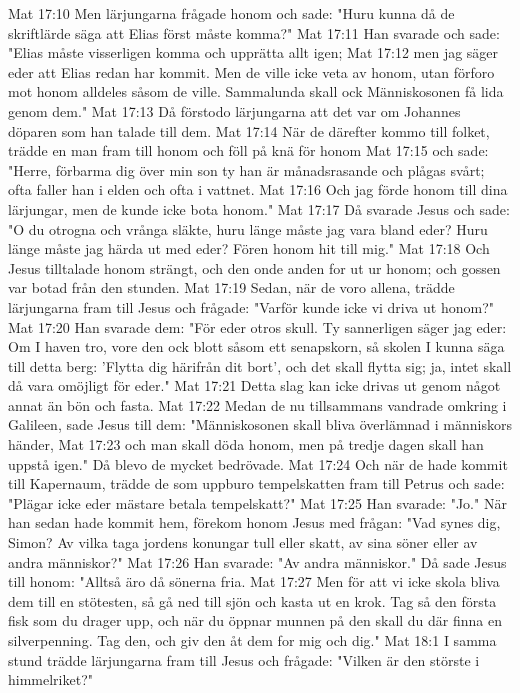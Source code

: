 Mat 17:10  Men lärjungarna frågade honom och sade: "Huru kunna då de skriftlärde säga att Elias först måste komma?"
Mat 17:11  Han svarade och sade: "Elias måste visserligen komma och upprätta allt igen;
Mat 17:12  men jag säger eder att Elias redan har kommit. Men de ville icke veta av honom, utan förforo mot honom alldeles såsom de ville. Sammalunda skall ock Människosonen få lida genom dem."
Mat 17:13  Då förstodo lärjungarna att det var om Johannes döparen som han talade till dem.
Mat 17:14  När de därefter kommo till folket, trädde en man fram till honom och föll på knä för honom
Mat 17:15  och sade: "Herre, förbarma dig över min son ty han är månadsrasande och plågas svårt; ofta faller han i elden och ofta i vattnet.
Mat 17:16  Och jag förde honom till dina lärjungar, men de kunde icke bota honom."
Mat 17:17  Då svarade Jesus och sade: "O du otrogna och vrånga släkte, huru länge måste jag vara bland eder? Huru länge måste jag härda ut med eder? Fören honom hit till mig."
Mat 17:18  Och Jesus tilltalade honom strängt, och den onde anden for ut ur honom; och gossen var botad från den stunden.
Mat 17:19  Sedan, när de voro allena, trädde lärjungarna fram till Jesus och frågade: "Varför kunde icke vi driva ut honom?"
Mat 17:20  Han svarade dem: "För eder otros skull. Ty sannerligen säger jag eder: Om I haven tro, vore den ock blott såsom ett senapskorn, så skolen I kunna säga till detta berg: 'Flytta dig härifrån dit bort', och det skall flytta sig; ja, intet skall då vara omöjligt för eder."
Mat 17:21  Detta slag kan icke drivas ut genom något annat än bön och fasta.
Mat 17:22  Medan de nu tillsammans vandrade omkring i Galileen, sade Jesus till dem: "Människosonen skall bliva överlämnad i människors händer,
Mat 17:23  och man skall döda honom, men på tredje dagen skall han uppstå igen." Då blevo de mycket bedrövade.
Mat 17:24  Och när de hade kommit till Kapernaum, trädde de som uppburo tempelskatten fram till Petrus och sade: "Plägar icke eder mästare betala tempelskatt?"
Mat 17:25  Han svarade: "Jo." När han sedan hade kommit hem, förekom honom Jesus med frågan: "Vad synes dig, Simon? Av vilka taga jordens konungar tull eller skatt, av sina söner eller av andra människor?"
Mat 17:26  Han svarade: "Av andra människor." Då sade Jesus till honom: "Alltså äro då sönerna fria.
Mat 17:27  Men för att vi icke skola bliva dem till en stötesten, så gå ned till sjön och kasta ut en krok. Tag så den första fisk som du drager upp, och när du öppnar munnen på den skall du där finna en silverpenning. Tag den, och giv den åt dem for mig och dig."
Mat 18:1  I samma stund trädde lärjungarna fram till Jesus och frågade: "Vilken är den störste i himmelriket?"
